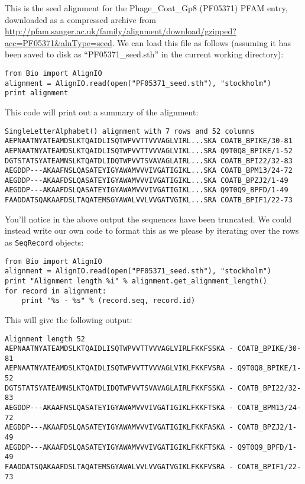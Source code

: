 \documentclass{report}
\begin{document}
This is the seed alignment for the Phage\_Coat\_Gp8 (PF05371) PFAM entry, downloaded as a compressed archive from \url{http://pfam.sanger.ac.uk/family/alignment/download/gzipped?acc=PF05371&alnType=seed}.  We can load this file as follows (assuming it has been saved to disk as ``PF05371\_seed.sth'' in the current working directory):

\begin{verbatim}
from Bio import AlignIO
alignment = AlignIO.read(open("PF05371_seed.sth"), "stockholm")
print alignment
\end{verbatim}

\noindent This code will print out a summary of the alignment:

\begin{verbatim}
SingleLetterAlphabet() alignment with 7 rows and 52 columns
AEPNAATNYATEAMDSLKTQAIDLISQTWPVVTTVVVAGLVIRL...SKA COATB_BPIKE/30-81
AEPNAATNYATEAMDSLKTQAIDLISQTWPVVTTVVVAGLVIKL...SRA Q9T0Q8_BPIKE/1-52
DGTSTATSYATEAMNSLKTQATDLIDQTWPVVTSVAVAGLAIRL...SKA COATB_BPI22/32-83
AEGDDP---AKAAFNSLQASATEYIGYAWAMVVVIVGATIGIKL...SKA COATB_BPM13/24-72
AEGDDP---AKAAFDSLQASATEYIGYAWAMVVVIVGATIGIKL...SKA COATB_BPZJ2/1-49
AEGDDP---AKAAFDSLQASATEYIGYAWAMVVVIVGATIGIKL...SKA Q9T0Q9_BPFD/1-49
FAADDATSQAKAAFDSLTAQATEMSGYAWALVVLVVGATVGIKL...SRA COATB_BPIF1/22-73
\end{verbatim}

You'll notice in the above output the sequences have been truncated.  We could instead write our own code to format this as we please by iterating over the rows as \verb|SeqRecord| objects:

\begin{verbatim}
from Bio import AlignIO
alignment = AlignIO.read(open("PF05371_seed.sth"), "stockholm")
print "Alignment length %i" % alignment.get_alignment_length()
for record in alignment:
    print "%s - %s" % (record.seq, record.id)
\end{verbatim}

\noindent This will give the following output:

\begin{verbatim}
Alignment length 52
AEPNAATNYATEAMDSLKTQAIDLISQTWPVVTTVVVAGLVIRLFKKFSSKA - COATB_BPIKE/30-81
AEPNAATNYATEAMDSLKTQAIDLISQTWPVVTTVVVAGLVIKLFKKFVSRA - Q9T0Q8_BPIKE/1-52
DGTSTATSYATEAMNSLKTQATDLIDQTWPVVTSVAVAGLAIRLFKKFSSKA - COATB_BPI22/32-83
AEGDDP---AKAAFNSLQASATEYIGYAWAMVVVIVGATIGIKLFKKFTSKA - COATB_BPM13/24-72
AEGDDP---AKAAFDSLQASATEYIGYAWAMVVVIVGATIGIKLFKKFASKA - COATB_BPZJ2/1-49
AEGDDP---AKAAFDSLQASATEYIGYAWAMVVVIVGATIGIKLFKKFTSKA - Q9T0Q9_BPFD/1-49
FAADDATSQAKAAFDSLTAQATEMSGYAWALVVLVVGATVGIKLFKKFVSRA - COATB_BPIF1/22-73
\end{verbatim}
\end{document}
